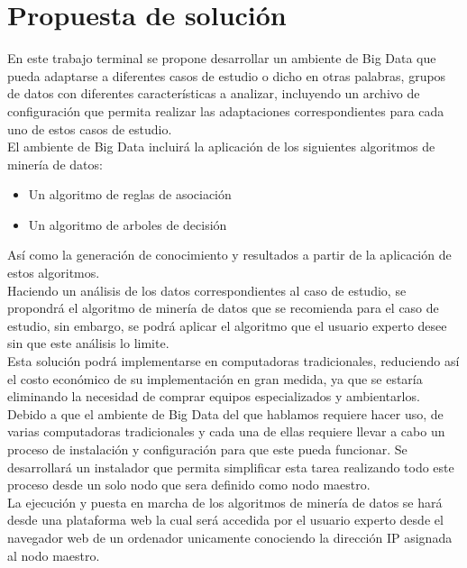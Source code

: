 \section{Propuesta de solución}
En este trabajo terminal se propone desarrollar un ambiente de Big Data que pueda adaptarse a diferentes casos de estudio o dicho en otras palabras, grupos de datos con diferentes características a analizar, incluyendo un archivo de configuración que permita realizar las adaptaciones correspondientes para cada uno de estos casos de estudio.
\\
El ambiente de Big Data incluirá la aplicación de los siguientes algoritmos de minería de datos: \\
\begin{itemize}
	\item Un algoritmo de reglas de asociación \\
	\item Un algoritmo de arboles de decisión \\
\end{itemize}
Así como la generación de conocimiento y resultados a partir de la aplicación de estos algoritmos.
\\
Haciendo un análisis de los datos correspondientes al caso de estudio, se propondrá el algoritmo de minería de datos que se recomienda para el caso de estudio, sin embargo, se podrá aplicar el algoritmo que el usuario experto desee sin que este análisis lo limite.
\\
Esta solución podrá implementarse en computadoras tradicionales, reduciendo así el costo económico de su implementación en gran medida, ya que se estaría eliminando la necesidad de comprar equipos especializados y ambientarlos.
\\
Debido a que el ambiente de Big Data del que hablamos requiere hacer uso, de varias computadoras tradicionales y cada una de ellas requiere llevar a cabo un proceso de instalación y configuración para que este pueda funcionar. Se desarrollará un instalador que permita simplificar esta tarea realizando todo este proceso desde un solo nodo que sera definido como nodo maestro.  
\\
La ejecución y puesta en marcha de los algoritmos de minería de datos se hará desde una plataforma web la cual será accedida por el usuario experto desde el navegador web de un ordenador unicamente conociendo la dirección IP asignada al nodo maestro.
\\